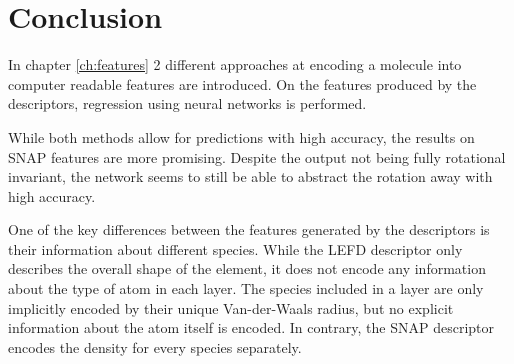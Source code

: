 
\chapter{Conclusion}
\label{ch:Conclusion}
In chapter \ref{ch:features} 2 different approaches at encoding a molecule into computer readable features are introduced.
On the features produced by the descriptors, regression using neural networks is performed.

While both methods allow for predictions with high accuracy, the results on SNAP features are more promising.
Despite the output not being fully rotational invariant, the network seems to still be able to abstract the rotation away with high accuracy.

One of the key differences between the features generated by the descriptors is their information about 
different species.
While the LEFD descriptor only describes the overall shape of the element, it does not encode any information about the 
type of atom in each layer.
The species included in a layer are only implicitly encoded by their unique Van-der-Waals radius, but no explicit information about the 
atom itself is encoded.
In contrary, the SNAP descriptor encodes the density for every species separately.

